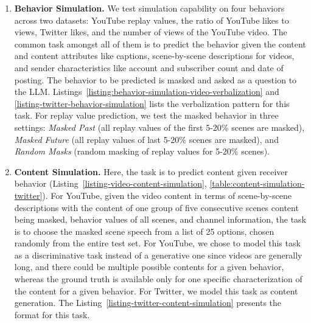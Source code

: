 \begin{enumerate}[leftmargin=*]
    \item\textbf{Behavior Simulation.} We test simulation capability on four behaviors across two datasets: YouTube replay values, the ratio of YouTube likes to views, Twitter likes, and the number of views of the YouTube video. The common task amongst all of them is to predict the behavior given the content and content attributes like captions, scene-by-scene descriptions for videos, and sender characteristics like account and subscriber count and date of posting. The behavior to be predicted is masked and asked as a question to the LLM. Listings~\ref{listing:behavior-simulation-video-verbalization} and \ref{listing-twitter-behavior-simulation} lists the verbalization pattern for this task. For replay value prediction, we test the masked behavior in three settings: \textit{Masked Past} (all replay values of the first 5-20\% scenes are masked), \textit{Masked Future} (all replay values of last 5-20\% scenes are masked), and \textit{Random Masks} (random masking of replay values for 5-20\% scenes).

    

    \item\textbf{Content Simulation.} Here, the task is to predict content given receiver behavior (Listing~\ref{listing-video-content-simulation}, \ref{table:content-simulation-twitter}). For YouTube, given the video content in terms of scene-by-scene descriptions with the content of one group of five consecutive scenes content being masked, behavior values of all scenes, and channel information, the task is to choose the masked scene speech from a list of 25 options, chosen randomly from the entire test set. For YouTube, we chose to model this task as a discriminative task instead of a generative one since videos are generally long, and there could be multiple possible contents for a given behavior, whereas the ground truth is available only for one specific characterization of the content for a given behavior. For Twitter, we model this task as content generation. The Listing~\ref{listing-twitter-content-simulation} presents the format for this task.
    

\end{enumerate}
